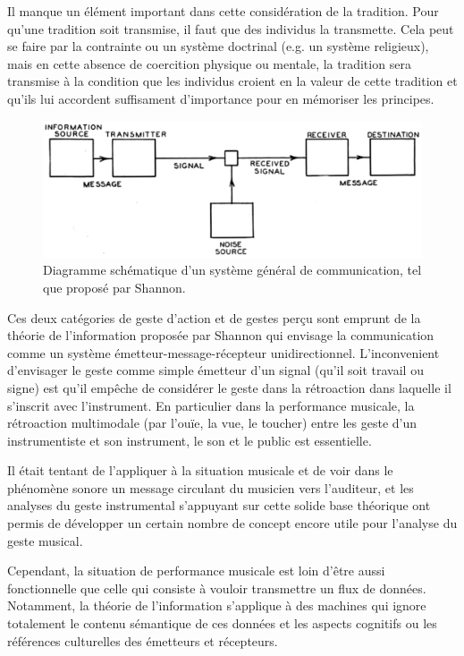 Il manque un élément important dans cette considération de la tradition. Pour qu'une tradition soit transmise, il faut que des individus la transmette. Cela peut se faire par la contrainte ou un système doctrinal (e.g. un système religieux), mais en cette absence de coercition physique ou mentale, la tradition sera transmise à la condition que les individus croient en la valeur de cette tradition et qu'ils lui accordent suffisament d'importance pour en mémoriser les principes.


\begin{figure}[!htbp]
	\includegraphics[width=\textwidth]{gfx/03_gesture/ShannonCommunicationSystem.png}
	\caption{Diagramme schématique d'un système général de communication, tel que proposé par Shannon.}
	\label{fig:gesture:shannon}
\end{figure}



Ces deux catégories de geste d'action et de gestes perçu sont emprunt de la théorie de l'information proposée par Shannon \cite{shannon_mathematical_1948} qui envisage la communication comme un système émetteur-message-récepteur unidirectionnel. 
L'inconvenient d'envisager le geste comme simple émetteur d'un signal (qu'il soit travail ou signe) est qu'il empêche de considérer le geste dans la rétroaction dans laquelle il s'inscrit avec l'instrument. En particulier dans la performance musicale, la rétroaction multimodale (par l'ouïe, la vue, le toucher) entre les geste d'un instrumentiste et son instrument, le son et le public est essentielle.

Il était tentant de l'appliquer à la situation musicale et de voir dans le phénomène sonore un message circulant du musicien vers l'auditeur, et les analyses du geste instrumental s'appuyant sur cette solide base théorique ont permis de développer un certain nombre de concept encore utile pour l'analyse du geste musical.

Cependant, la situation de performance musicale est loin d'être aussi fonctionnelle que celle qui consiste à vouloir transmettre un flux de données. Notamment, la théorie de l'information s'applique à des machines qui ignore totalement le contenu sémantique de ces données et les aspects cognitifs ou les références culturelles des émetteurs et récepteurs.






